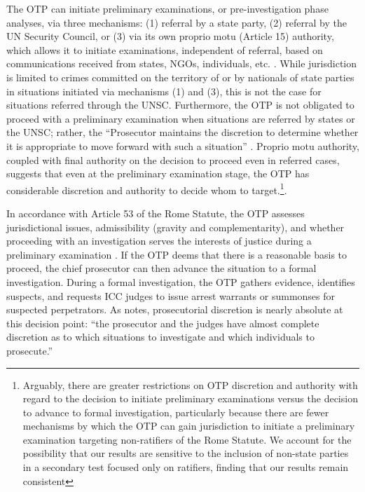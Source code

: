 The OTP can initiate preliminary examinations, or pre-investigation phase analyses, via three mechanisms: (1) referral by a state party, (2) referral by the UN Security Council, or (3) via its own proprio motu (Article 15) authority, which allows it to initiate examinations, independent of referral, based on communications received from states, NGOs, individuals, etc. \citep{schabas2011introduction, smeulers2015selection}. While jurisdiction is limited to crimes committed on the territory of or by nationals of state parties in situations initiated via mechanisms (1) and (3), this is not the case for situations referred through the UNSC. Furthermore, the OTP is not obligated to proceed with a preliminary examination when situations are referred by states or the UNSC; rather, the ``Prosecutor maintains the discretion to determine whether it is appropriate to move forward with such a situation'' \citep[5]{smeulers2015selection}.  Proprio motu authority, coupled with final authority on the decision to proceed even in referred cases, suggests that even at the preliminary examination stage, the OTP has considerable discretion and authority to decide whom to target.\footnote{Arguably, there are greater restrictions on OTP discretion and authority with regard to the decision to initiate preliminary examinations versus the decision to advance to formal investigation, particularly because there are fewer mechanisms by which the OTP can gain jurisdiction to initiate a preliminary examination targeting non-ratifiers of the Rome Statute. We account for the possibility that our results are sensitive to the inclusion of non-state parties in a secondary test focused only on ratifiers, finding that our results remain consistent}.

In accordance with Article 53 of the Rome Statute, the OTP assesses jurisdictional issues, admissibility (gravity and complementarity), and whether proceeding with an investigation serves the interests of justice during a preliminary examination \citep{otp2013r}. If the OTP deems that there is a reasonable basis to proceed, the chief prosecutor can then advance the situation to a formal investigation. During a formal investigation, the OTP gathers evidence, identifies suspects, and requests ICC judges to issue arrest warrants or summonses for suspected perpetrators. As \citet[8]{bosco2013rough} notes, prosecutorial discretion is nearly absolute at this decision point: ``the prosecutor and the judges have almost complete discretion as to which situations to investigate and which individuals to prosecute.''

